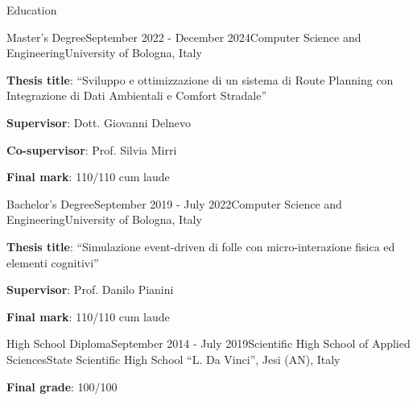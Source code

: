 \documentclass[
	11pt, %
]{resume} %
\begin{document}


\begin{rSection}{Education}
	\begin{rSubsection}{Master's Degree}{September 2022 - December 2024}{Computer Science and Engineering}{University of Bologna, Italy}
	    \item \textbf{Thesis title}: ``Sviluppo e ottimizzazione di un sistema di Route Planning con Integrazione di Dati Ambientali e Comfort Stradale''
        \item \textbf{Supervisor}: Dott. Giovanni Delnevo
        \item \textbf{Co-supervisor}: Prof. Silvia Mirri
        \item \textbf{Final mark}: 110/110 cum laude 
	\end{rSubsection}
    
    \begin{rSubsection}{Bachelor's Degree}{September 2019 - July 2022}{Computer Science and Engineering}{University of Bologna, Italy}
	    \item \textbf{Thesis title}: ``Simulazione event-driven di folle con micro-interazione fisica ed elementi cognitivi''
        \item \textbf{Supervisor}: Prof. Danilo Pianini
        \item \textbf{Final mark}: 110/110 cum laude
	\end{rSubsection}

    \begin{rSubsection}{High School Diploma}{September 2014 - July 2019}{Scientific High School of Applied Sciences}{State Scientific High School ``L. Da Vinci'', Jesi (AN), Italy}
	    \item \textbf{Final grade}: 100/100
	\end{rSubsection}
	
\end{rSection}

\end{document}
